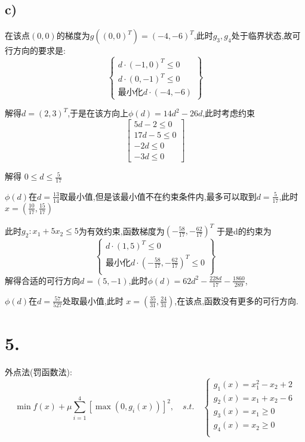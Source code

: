 \documentclass{article}
\begin{document}
	\subsection*{c)}
		
	在该点$(0,0)$的梯度为$g((0,0)^T)=(-4,-6)^T$,此时$g_3,g_4$处于临界状态,故可行方向的要求是:
	\[\left\{
	\begin{array}{c}
	d \cdot (-1,0)^T \leq 0\\
	d \cdot (0,-1)^T \leq 0\\
	\text{最小化} d \cdot (-4,-6)
	\end{array}
	\right\}\]

	解得$d = (2,3)^T$,于是在该方向上$\phi(d) = 14d^2 - 26d$,此时考虑约束
	\[\left[\begin{matrix}
	5 d - 2\leq 0\\17 d - 5\leq 0\\- 2 d\leq 0\\- 3 d \leq 0
	\end{matrix}\right]\]

	解得 $0 \leq d \leq \frac{5}{17}$

	\(\phi(d)\)在$d= \frac{13}{14}$取最小值,但是该最小值不在约束条件内,最多可以取到$d=\frac{5}{17}$,此时$x = (\frac{10}{17},\frac{15}{17})$

	此时$g_2: x_1 + 5x_2 \leq 5$为有效约束,函数梯度为\((- \frac{58}{17},- \frac{62}{17})^T\)
	于是d的约束为
	\[\left\{
	\begin{array}{c}
	d \cdot (1,5)^T \leq 0\\
		\text{最小化} d \cdot (- \frac{58}{17},- \frac{62}{17})^T \leq 0\\
	\end{array}
	\right\}\]
	解得合适的可行方向$d = (5,-1)$,此时$\phi(d) = 62 d^{2} - \frac{228 d}{17} - \frac{1860}{289}$,

	$\phi(d)$在\(d = \frac{57}{527}\)处取最小值,此时 $x=(\frac{35}{31},\frac{24}{31})$,在该点,函数没有更多的可行方向.

	\section*{5.}

	外点法(罚函数法):
	\[\min f(x) + \mu \sum_{i=1}^{4}[\max(0,g_i(x))]^2, \quad s.t. \quad \left\{\begin{array}{c}
	g_1(x) = x_1^2 - x_2+2  \\
	g_2(x)= x_1 + x_2 -6 \\
	g_3(x)= x_1 \geq 0 \\
		g_4(x) = x_2 \geq 0 \\
	\end{array}\right.\]
\end{document}
